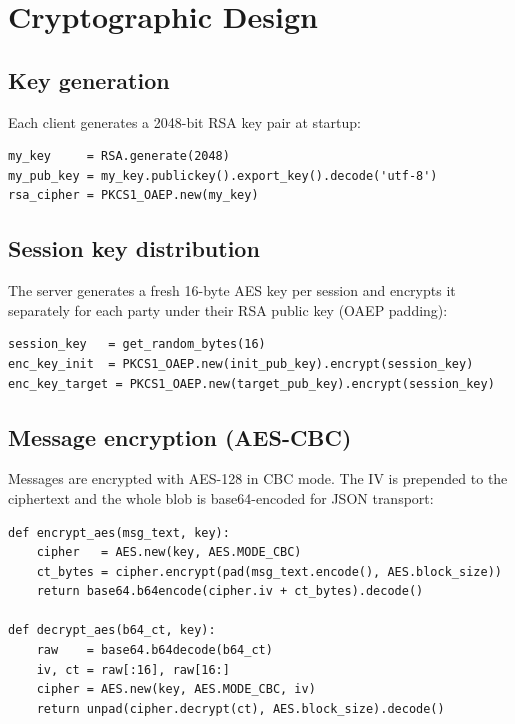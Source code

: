 \documentclass[12pt,a4paper]{article}
\begin{document}
\section{Cryptographic Design}

\subsection{Key generation}

Each client generates a 2048-bit RSA key pair at startup:

\begin{lstlisting}
my_key     = RSA.generate(2048)
my_pub_key = my_key.publickey().export_key().decode('utf-8')
rsa_cipher = PKCS1_OAEP.new(my_key)
\end{lstlisting}

\subsection{Session key distribution}

The server generates a fresh 16-byte AES key per session and encrypts it separately for each party under their RSA public key (OAEP padding):

\begin{lstlisting}
session_key   = get_random_bytes(16)
enc_key_init  = PKCS1_OAEP.new(init_pub_key).encrypt(session_key)
enc_key_target = PKCS1_OAEP.new(target_pub_key).encrypt(session_key)
\end{lstlisting}

\subsection{Message encryption (AES-CBC)}

Messages are encrypted with AES-128 in CBC mode. The IV is prepended to the ciphertext and the whole blob is base64-encoded for JSON transport:

\begin{lstlisting}
def encrypt_aes(msg_text, key):
    cipher   = AES.new(key, AES.MODE_CBC)
    ct_bytes = cipher.encrypt(pad(msg_text.encode(), AES.block_size))
    return base64.b64encode(cipher.iv + ct_bytes).decode()

def decrypt_aes(b64_ct, key):
    raw    = base64.b64decode(b64_ct)
    iv, ct = raw[:16], raw[16:]
    cipher = AES.new(key, AES.MODE_CBC, iv)
    return unpad(cipher.decrypt(ct), AES.block_size).decode()
\end{lstlisting}
\end{document}

